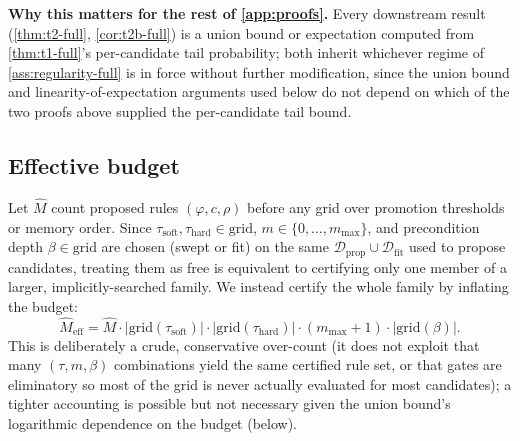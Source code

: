 \documentclass[11pt]{article}
\theoremstyle{plain}
\theoremstyle{definition}
\theoremstyle{remark}
\begin{document}
\textbf{Why this matters for the rest of \autoref{app:proofs}.} Every downstream result (\autoref{thm:t2-full}, \autoref{cor:t2b-full}) is a union bound or expectation computed from \autoref{thm:t1-full}'s per-candidate tail probability; both inherit whichever regime of \autoref{ass:regularity-full} is in force without further modification, since the union bound and linearity-of-expectation arguments used below do not depend on which of the two proofs above supplied the per-candidate tail bound.

\subsection*{Effective budget}
Let $\hat M$ count proposed rules $(\varphi,c,\rho)$ before any grid over promotion thresholds or memory order. Since $\tau_{\mathrm{soft}},\tau_{\mathrm{hard}}\in\mathrm{grid}$, $m\in\{0,\dots,m_{\max}\}$, and precondition depth $\beta\in\mathrm{grid}$ are chosen (swept or fit) on the same $\mathcal{D}_{\mathrm{prop}}\cup\mathcal{D}_{\mathrm{fit}}$ used to propose candidates, treating them as free is equivalent to certifying only one member of a larger, implicitly-searched family. We instead certify the whole family by inflating the budget:
$$\hat M_{\mathrm{eff}} = \hat M\cdot|\mathrm{grid}(\tau_{\mathrm{soft}})|\cdot|\mathrm{grid}(\tau_{\mathrm{hard}})|\cdot(m_{\max}{+}1)\cdot|\mathrm{grid}(\beta)|.$$
This is deliberately a crude, conservative over-count (it does not exploit that many $(\tau,m,\beta)$ combinations yield the same certified rule set, or that gates are eliminatory so most of the grid is never actually evaluated for most candidates); a tighter accounting is possible but not necessary given the union bound's logarithmic dependence on the budget (below).
\end{document}
